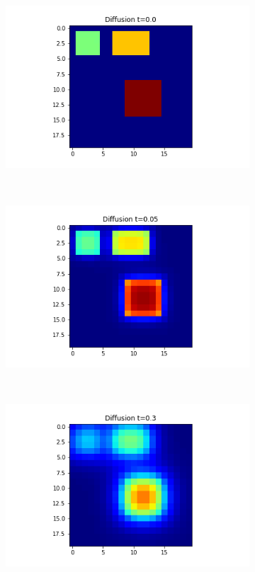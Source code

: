 \documentclass[10pt,a4paper]{article}
\begin{document}
\begin{enumerate}[i)]
\begin{enumerate}[a)]
\begin{figure}[!h]
\begin{subfigure}[b]{0.25\textwidth}
         	    		\includegraphics[width=\textwidth]{images/mellin-x4-t0.png}
         	    	\end{subfigure}~
         	    	\begin{subfigure}[b]{0.25\textwidth}
         	    		\includegraphics[width= \textwidth]{images/mellin-x4-t05.png}
         	    	\end{subfigure}~
         	    	\begin{subfigure}[b]{0.25\textwidth}
         	    		\includegraphics[width= \textwidth]{images/mellin-x4-t3.png}

\end{subfigure}
\end{figure}
\end{enumerate}
\end{enumerate}
\end{document}
